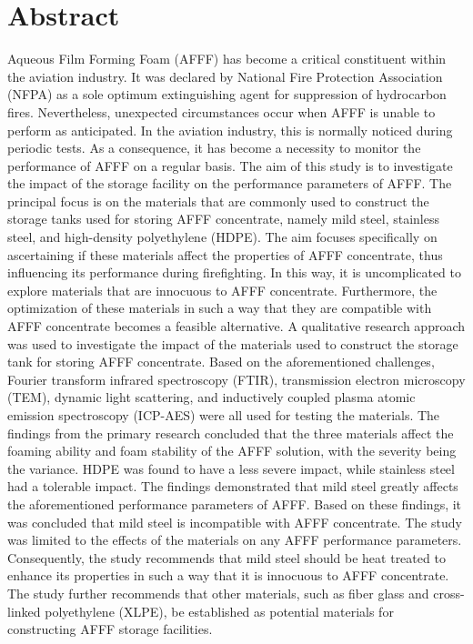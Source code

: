 \chapter{Abstract}
Aqueous Film Forming Foam (AFFF) has become a critical constituent within the aviation industry. It was declared by National Fire Protection Association (NFPA) as a sole optimum extinguishing agent for suppression of hydrocarbon fires. Nevertheless, unexpected circumstances occur when AFFF is unable to perform as anticipated. In the aviation industry, this is normally noticed during periodic tests. As a consequence, it has become a necessity to monitor the performance of AFFF on a regular basis.
The aim of this study is to investigate the impact of the storage facility on the performance parameters of AFFF. The principal focus is on the materials that are commonly used to construct the storage tanks used for storing AFFF concentrate, namely mild steel, stainless steel, and high-density polyethylene (HDPE). The aim focuses specifically on ascertaining if these materials affect the properties of AFFF concentrate, thus influencing its performance during firefighting. In this way, it is uncomplicated to explore materials that are innocuous to AFFF concentrate. Furthermore, the optimization of these materials in such a way that they are compatible with AFFF concentrate becomes a feasible alternative.
A qualitative research approach was used to investigate the impact of the materials used to construct the storage tank for storing AFFF concentrate. Based on the aforementioned challenges, Fourier transform infrared spectroscopy (FTIR), transmission electron microscopy (TEM), dynamic light scattering, and inductively coupled plasma atomic emission spectroscopy (ICP-AES) were all used for testing the materials. The findings from the primary research concluded that the three materials affect the foaming ability and foam stability of the AFFF solution, with the severity being the variance. HDPE was found to have a less severe impact, while stainless steel had a tolerable impact. The findings demonstrated that mild steel greatly affects the aforementioned performance parameters of AFFF. Based on these findings, it was concluded that mild steel is incompatible with AFFF concentrate.
The study was limited to the effects of the materials on any AFFF performance parameters. Consequently, the study recommends that mild steel should be heat treated to enhance its properties in such a way that it is innocuous to AFFF concentrate. The study further recommends that other materials, such as fiber glass and cross-linked polyethylene (XLPE), be established as potential materials for constructing AFFF storage facilities.